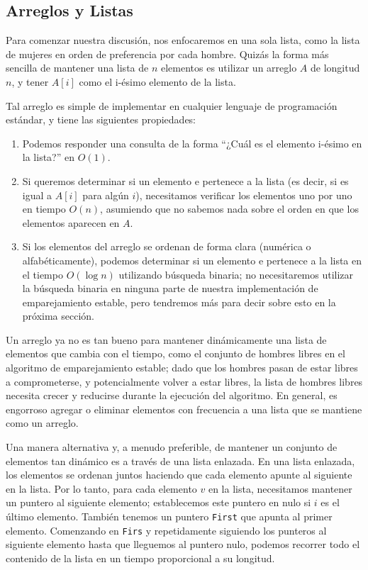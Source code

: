 \documentclass[a4paper, 12pt]{book}
\theoremstyle{dotless}
\begin{document}
\subsection*{Arreglos y Listas}

Para comenzar nuestra discusión, nos enfocaremos en una sola lista, como la lista de mujeres en orden de preferencia por cada hombre. Quizás la forma más sencilla de mantener una lista de $n$ elementos es utilizar un arreglo $A$ de longitud $n$, y tener $A[i]$ como el i-ésimo elemento de la lista. 

Tal arreglo es simple de implementar en cualquier lenguaje de programación estándar, y tiene las siguientes propiedades:

\begin{enumerate}
    \item  Podemos responder una consulta de la forma ``¿Cuál es el elemento i-ésimo en la lista?'' en $O(1)$.
    \item Si queremos determinar si un elemento e pertenece a la lista (es decir, si es igual a $A[i]$ para algún $i$), necesitamos verificar los elementos uno por uno en tiempo $O(n)$, asumiendo que no sabemos nada sobre el orden en que los elementos aparecen en $A$.
    \item  Si los elementos del arreglo se ordenan de forma clara (numérica o alfabéticamente), podemos determinar si un elemento e pertenece a la lista en el tiempo $O(\log n)$ utilizando búsqueda binaria; no necesitaremos utilizar la búsqueda binaria en ninguna parte de nuestra implementación de emparejamiento estable, pero tendremos más para decir sobre esto en la próxima sección.
   \end{enumerate}

Un arreglo ya no es tan bueno para mantener dinámicamente una lista de elementos que cambia con el tiempo, como el conjunto de hombres libres en el algoritmo de emparejamiento estable; dado que los hombres pasan de estar libres a comprometerse, y potencialmente volver a estar libres, la lista de hombres libres necesita crecer y reducirse durante la ejecución del algoritmo. En general, es engorroso agregar o eliminar elementos con frecuencia a una lista que se mantiene como un arreglo. 

Una manera alternativa y, a menudo preferible, de mantener un conjunto de elementos tan dinámico es a través de una lista enlazada. En una lista enlazada, los elementos se ordenan juntos haciendo que cada elemento apunte al siguiente en la lista. Por lo tanto, para cada elemento $v$ en la lista, necesitamos mantener un puntero al siguiente elemento; establecemos este puntero en nulo si $i$ es el último elemento. También tenemos un puntero \texttt{First} que apunta al primer elemento. Comenzando en \texttt{Firs} y repetidamente siguiendo los punteros al siguiente elemento hasta que lleguemos al puntero nulo, podemos recorrer todo el contenido de la lista en un tiempo proporcional a su longitud. 
\end{document}
